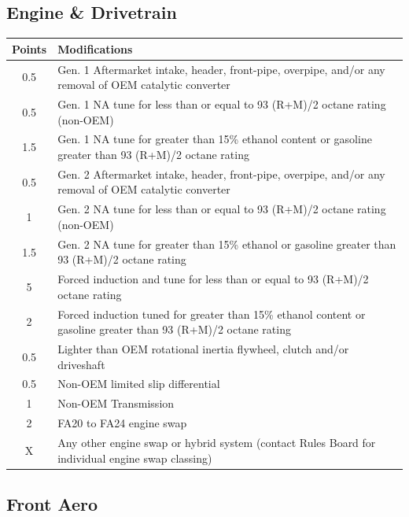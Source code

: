 \documentclass{article}
\newenvironment{legallist}{
    \begin{enumerate}[label*=\arabic*.]
}{
    \end{enumerate}
}
\newenvironment{mods}{
    \begin{longtable}{c p{6in}}
    \toprule
    \textbf{Points} & \textbf{Modifications} \\
    \midrule
}{
    \bottomrule
    \end{longtable}
}
\begin{document}
\begin{legallist}
			\subsection*{Engine \& Drivetrain}
						
			\begin{mods}
				0.5 & Gen. 1 Aftermarket intake, header, front-pipe, overpipe, and/or any removal of OEM catalytic converter \\
				\midrule
				0.5 & Gen. 1 NA tune for less than or equal to 93 (R+M)/2 octane rating (non-OEM) \\
				\midrule
				1.5 & Gen. 1 NA tune for greater than 15\% ethanol content or gasoline greater than 93 (R+M)/2 octane rating \\
				\midrule
				0.5 & Gen. 2 Aftermarket intake, header, front-pipe, overpipe, and/or any removal of OEM catalytic converter \\ 
				\midrule
				1 & Gen. 2 NA tune for less than or equal to 93 (R+M)/2 octane rating (non-OEM) \\
				\midrule
				1.5 & Gen. 2 NA tune for greater than 15\% ethanol or gasoline greater than 93 (R+M)/2 octane rating \\
				\midrule
				5 & Forced induction and tune for less than or equal to 93 (R+M)/2 octane rating \\
				\midrule
				2 & Forced induction tuned for greater than 15\% ethanol content or gasoline greater than 93 (R+M)/2 octane rating \\
				\midrule
				0.5 & Lighter than OEM rotational inertia flywheel, clutch and/or driveshaft \\ 
				\midrule
				0.5 & Non-OEM limited slip differential \\ 
				\midrule
				1 & Non-OEM Transmission \\
				\midrule
				2 & FA20 to FA24 engine swap \\ 
				\midrule
				X & Any other engine swap or hybrid system (contact Rules Board for individual engine swap classing) \\
			\end{mods}
						
			\subsection*{Front Aero}
						

\end{legallist}
\end{document}
